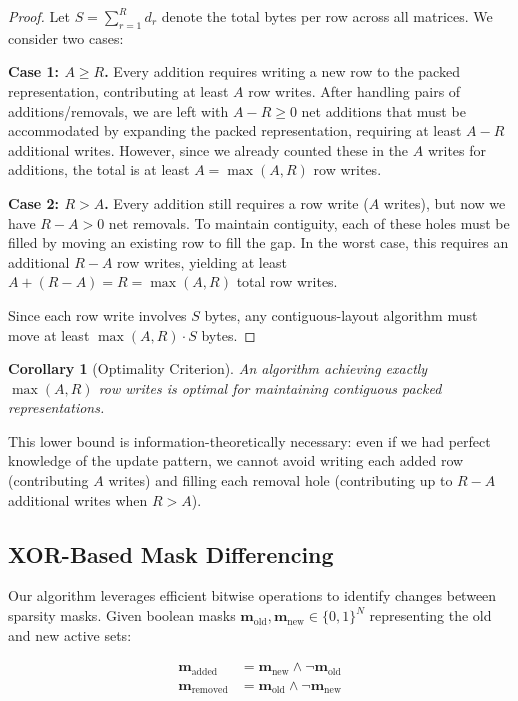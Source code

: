 \documentclass{article}
\numberwithin{equation}{section}
\theoremstyle{plain}
\newtheorem{corollary}[theorem]{Corollary}
\theoremstyle{definition}
\theoremstyle{remark}
\begin{document}
\begin{proof}
Let $S = \sum_{r=1}^R d_r$ denote the total bytes per row across all matrices. We consider two cases:

\textbf{Case 1: $A \geq R$.} Every addition requires writing a new row to the packed representation, contributing at least $A$ row writes. After handling pairs of additions/removals, we are left with $A - R \geq 0$ net additions that must be accommodated by expanding the packed representation, requiring at least $A - R$ additional writes. However, since we already counted these in the $A$ writes for additions, the total is at least $A = \max(A, R)$ row writes.

\textbf{Case 2: $R > A$.} Every addition still requires a row write ($A$ writes), but now we have $R - A > 0$ net removals. To maintain contiguity, each of these holes must be filled by moving an existing row to fill the gap. In the worst case, this requires an additional $R - A$ row writes, yielding at least $A + (R - A) = R = \max(A, R)$ total row writes.

Since each row write involves $S$ bytes, any contiguous-layout algorithm must move at least $\max(A, R) \cdot S$ bytes.
\end{proof}

\begin{corollary}[Optimality Criterion]
An algorithm achieving exactly $\max(A, R)$ row writes is optimal for maintaining contiguous packed representations.
\end{corollary}

This lower bound is information-theoretically necessary: even if we had perfect knowledge of the update pattern, we cannot avoid writing each added row (contributing $A$ writes) and filling each removal hole (contributing up to $R - A$ additional writes when $R > A$).

\subsection{XOR-Based Mask Differencing}

Our algorithm leverages efficient bitwise operations to identify changes between sparsity masks. Given boolean masks $\mathbf{m}_{\text{old}}, \mathbf{m}_{\text{new}} \in \{0, 1\}^N$ representing the old and new active sets:

\begin{align}
\mathbf{m}_{\text{added}} &= \mathbf{m}_{\text{new}} \land \neg \mathbf{m}_{\text{old}} \\
\mathbf{m}_{\text{removed}} &= \mathbf{m}_{\text{old}} \land \neg \mathbf{m}_{\text{new}}
\end{align}
\end{document}
